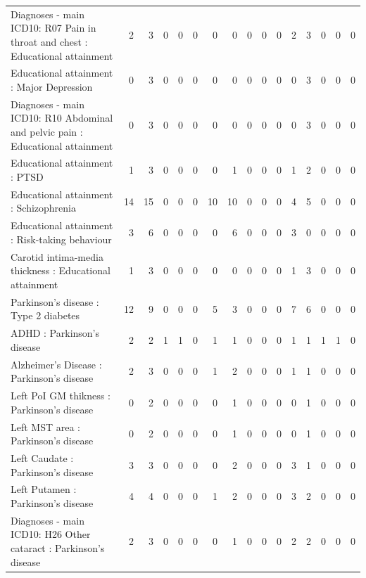 \begin{table}[ht]
\begin{tabular}{lrrrrrrrrrrrrrrr}
  Diagnoses - main ICD10: R07 Pain in throat and chest : Educational attainment &   2 &   3 &   0 &   0 &   0 &   0 &   0 &   0 &   0 &   0 &   2 &   3 &   0 &   0 &   0 \\ 
  Educational attainment : Major Depression &   0 &   3 &   0 &   0 &   0 &   0 &   0 &   0 &   0 &   0 &   0 &   3 &   0 &   0 &   0 \\ 
  Diagnoses - main ICD10: R10 Abdominal and pelvic pain : Educational attainment &   0 &   3 &   0 &   0 &   0 &   0 &   0 &   0 &   0 &   0 &   0 &   3 &   0 &   0 &   0 \\ 
  Educational attainment : PTSD &   1 &   3 &   0 &   0 &   0 &   0 &   1 &   0 &   0 &   0 &   1 &   2 &   0 &   0 &   0 \\ 
  Educational attainment : Schizophrenia &  14 &  15 &   0 &   0 &   0 &  10 &  10 &   0 &   0 &   0 &   4 &   5 &   0 &   0 &   0 \\ 
  Educational attainment : Risk-taking behaviour &   3 &   6 &   0 &   0 &   0 &   0 &   6 &   0 &   0 &   0 &   3 &   0 &   0 &   0 &   0 \\ 
  Carotid intima-media thickness : Educational attainment &   1 &   3 &   0 &   0 &   0 &   0 &   0 &   0 &   0 &   0 &   1 &   3 &   0 &   0 &   0 \\ 
  Parkinson's disease : Type 2 diabetes &  12 &   9 &   0 &   0 &   0 &   5 &   3 &   0 &   0 &   0 &   7 &   6 &   0 &   0 &   0 \\ 
  ADHD : Parkinson's disease &   2 &   2 &   1 &   1 &   0 &   1 &   1 &   0 &   0 &   0 &   1 &   1 &   1 &   1 &   0 \\ 
  Alzheimer's Disease : Parkinson's disease &   2 &   3 &   0 &   0 &   0 &   1 &   2 &   0 &   0 &   0 &   1 &   1 &   0 &   0 &   0 \\ 
  Left PoI GM thikness : Parkinson's disease &   0 &   2 &   0 &   0 &   0 &   0 &   1 &   0 &   0 &   0 &   0 &   1 &   0 &   0 &   0 \\ 
  Left MST area : Parkinson's disease &   0 &   2 &   0 &   0 &   0 &   0 &   1 &   0 &   0 &   0 &   0 &   1 &   0 &   0 &   0 \\ 
  Left Caudate : Parkinson's disease &   3 &   3 &   0 &   0 &   0 &   0 &   2 &   0 &   0 &   0 &   3 &   1 &   0 &   0 &   0 \\ 
  Left Putamen : Parkinson's disease &   4 &   4 &   0 &   0 &   0 &   1 &   2 &   0 &   0 &   0 &   3 &   2 &   0 &   0 &   0 \\ 
  Diagnoses - main ICD10: H26 Other cataract : Parkinson's disease &   2 &   3 &   0 &   0 &   0 &   0 &   1 &   0 &   0 &   0 &   2 &   2 &   0 &   0 &   0 \\ 

\end{tabular}
\end{table}

